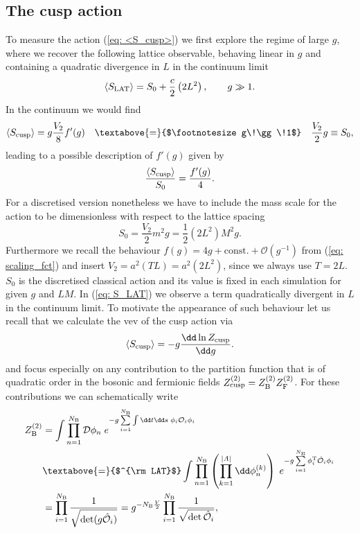 \subsection{The cusp action}
To measure the action (\ref{eq: <S_cusp>}) we first explore the regime of large $g$, where we recover the following lattice observable, behaving linear in $g$ and containing a quadratic divergence in $L$ in the continuum limit
%
%
\begin{equation}
\langle S_{\rm LAT} \rangle = S_{0} + \frac{c}{2} \left(2L^{2}\right), \qquad g\gg 1.
\label{eq: S_LAT}
\end{equation}
%
%
In the continuum we would find
%
%
\begin{equation}
\langle S_{\rm cusp} \rangle = g \frac{V_{2}}{8}f'(g)  \quad \textabove{=}{$\footnotesize g\!\gg\!1$} \quad \frac{V_{2}}{2}g \equiv S_{0},
\end{equation}
%
%
leading to a possible description of $f'(g)$ given by
%
%
\begin{equation}
\frac{\langle S_{\rm cusp }\rangle}{S_{0}} = \frac{f'(g)}{4}.
\label{eq: Scusp_fprime}
\end{equation}
%
%
For a discretised version nonetheless we have to include the mass scale for the action to be dimensionless with respect to the lattice spacing
%
%
\begin{equation}
S_{0} = \frac{V_{2}}{2} m^{2}g = \frac{1}{2}\left(2L^{2}\right) M^{2} g.
\end{equation}
%
%
Furthermore we recall the behaviour $f(g) = 4g + \text{const.} + \mathcal{O}(g^{-1})$ from (\ref{eq: scaling_fct}) and insert $V_{2}=a^{2}(TL)=a^{2}(2L^{2})$, since we always use $T=2L$. $S_{0}$ is the discretised classical action and its value is fixed in each simulation for given $g$ and $LM$. In (\ref{eq: S_LAT}) we observe a term quadratically divergent in $L$ in the continuum limit. To motivate the appearance of such behaviour let us recall that we calculate the vev of the cusp action via
%
%
\begin{equation}
 \langle S_{\rm cusp} \rangle = -g \frac{\dd \ln Z_{\rm cusp}}{\dd g}.
 \end{equation} 
and focus especially on any contribution to the partition function that is of quadratic order in the bosonic and fermionic fields  $Z_{\rm cusp}^{(2)}=Z_{\rm B}^{(2)}Z_{\rm F}^{(2)}$. For these contributions we can schematically write
\begin{equation}
\begin{alignedat}{2}
Z_{\rm B}^{(2)} &= \int \prod\limits_{n=1}^{N_{\rm B}} \mathcal{D}\phi_{n} \; e^{-g \sum\limits_{i=1}^{N_{\rm B}} \int \dd t \dd s\; \phi_{i} \mathcal{O}_{i} \phi_{i}} \\
%
%
&\textabove{=}{$^{\rm LAT}$} \int \prod\limits_{n=1}^{N_{\rm B}} \left( \prod\limits_{k=1}^{\vert \mathit{\Lambda}\vert} \dd \phi_{n}^{(k)} \right) \; e^{-g \sum\limits_{i=1}^{N_{\rm B}} \phi_{i}^{\rm T}\hat{\mathcal{O}}_{i}\phi_{i}} \\
%
%
&= \prod\limits_{i=1}^{N_{\rm B}} \frac{1}{\sqrt{\det (g \hat{\mathcal{O}}_{i})}}   =    g^{-N_{\rm B}\frac{V}{2}} \prod\limits_{i=1}^{N_{\rm B}} \frac{1}{\sqrt{\det \hat{\mathcal{O}}_{i}}}  ,
\end{alignedat}
\end{equation}
